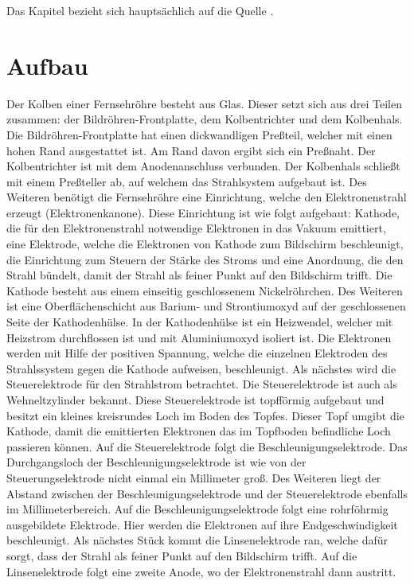 Das Kapitel bezieht sich hauptsächlich auf die Quelle \cite{Fernsehroehre}.
\section{Aufbau}
\label{sec:aufbau}
Der Kolben einer Fernsehröhre besteht aus Glas.
Dieser setzt sich aus drei Teilen zusammen: der Bildröhren-Frontplatte, dem Kolbentrichter und dem Kolbenhals.
Die Bildröhren-Frontplatte hat einen dickwandligen Preßteil, welcher mit einen hohen Rand ausgestattet ist.
Am Rand davon ergibt sich ein Preßnaht.
Der Kolbentrichter ist mit dem Anodenanschluss verbunden.
Der Kolbenhals schließt mit einem Preßteller ab, auf welchem das Strahlsystem aufgebaut ist.
Des Weiteren benötigt die Fernsehröhre eine Einrichtung, welche den Elektronenstrahl erzeugt (Elektronenkanone).
Diese Einrichtung ist wie folgt aufgebaut: Kathode, die für den Elektronenstrahl notwendige Elektronen in das Vakuum emittiert, eine Elektrode, welche die Elektronen von Kathode zum Bildschirm beschleunigt, die Einrichtung zum Steuern der Stärke des Stroms und eine Anordnung, die den Strahl bündelt, damit der Strahl als feiner Punkt auf den Bildschirm trifft. 
Die Kathode besteht aus einem einseitig geschlossenem Nickelröhrchen.
Des Weiteren ist eine Oberflächenschicht aus Barium- und Strontiumoxyd auf der geschlossenen Seite der Kathodenhülse.
In der Kathodenhülse ist ein Heizwendel, welcher mit Heizstrom durchflossen ist und mit Aluminiumoxyd isoliert ist.
Die Elektronen werden mit Hilfe der positiven Spannung, welche die einzelnen Elektroden des Strahlssystem gegen die Kathode aufweisen, beschleunigt.
Als nächstes wird die Steuerelektrode für den Strahlstrom betrachtet.
Die Steuerelektrode ist auch als Wehneltzylinder bekannt.
Diese Steuerelektrode ist topfförmig aufgebaut und besitzt ein kleines kreisrundes Loch im Boden des Topfes.
Dieser Topf umgibt die Kathode, damit die emittierten Elektronen das im Topfboden befindliche Loch passieren können.
Auf die Steuerelektrode folgt die Beschleunigungselektrode.
Das Durchgangsloch der Beschleunigungselektrode ist wie von der Steuerungselektrode nicht einmal ein Millimeter groß.
Des Weiteren liegt der Abstand zwischen der Beschleunigungselektrode und der Steuerelektrode ebenfalls im Millimeterbereich.
Auf die Beschleunigungselektrode folgt eine rohrföhrmig ausgebildete Elektrode.
Hier werden die Elektronen auf ihre Endgeschwindigkeit beschleunigt.
Als nächstes Stück kommt die Linsenelektrode ran, welche dafür sorgt, dass der Strahl als feiner Punkt auf den Bildschirm trifft.
Auf die Linsenelektrode folgt eine zweite Anode, wo der Elektronenstrahl dann austritt.
